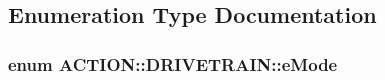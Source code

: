 \subsection{\-Enumeration \-Type \-Documentation}
\hypertarget{namespace_a_c_t_i_o_n_1_1_d_r_i_v_e_t_r_a_i_n_a52df779bea12a00bee80e6b0d57372a2}{
\subsubsection[{e\-Mode}]{\setlength{\rightskip}{0pt plus 5cm}enum {\bf \-A\-C\-T\-I\-O\-N\-::\-D\-R\-I\-V\-E\-T\-R\-A\-I\-N\-::e\-Mode}}}
\label{namespace_a_c_t_i_o_n_1_1_d_r_i_v_e_t_r_a_i_n_a52df779bea12a00bee80e6b0d57372a2}
